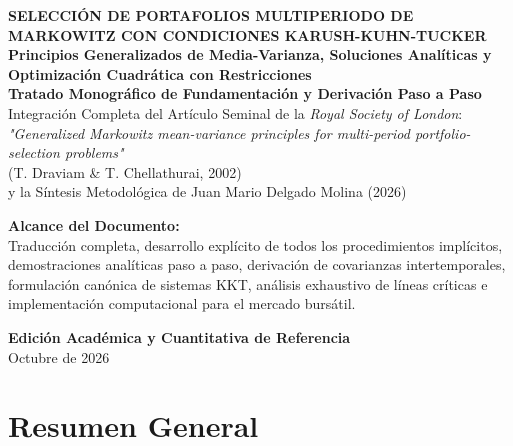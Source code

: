 \documentclass[11pt,a4paper]{report}
\numberwithin{equation}{chapter}
\begin{document}
\begin{titlepage}
    \centering
    \vspace*{1.5cm}
    
    {\Huge \bfseries \color{navyblue} SELECCIÓN DE PORTAFOLIOS MULTIPERIODO DE MARKOWITZ CON CONDICIONES KARUSH-KUHN-TUCKER}\\[0.6cm]
    {\LARGE \textbf{Principios Generalizados de Media-Varianza, Soluciones Analíticas y Optimización Cuadrática con Restricciones}}\\[1.5cm]
    
    \textbf{\Large Tratado Monográfico de Fundamentación y Derivación Paso a Paso}\\[0.4cm]
    \large Integración Completa del Artículo Seminal de la \emph{Royal Society of London}:\\
    \textsl{"Generalized Markowitz mean-variance principles for multi-period portfolio-selection problems"}\\
    (T. Draviam \& T. Chellathurai, 2002)\\
    y la Síntesis Metodológica de Juan Mario Delgado Molina (2026)\\[2.5cm]
    
    \begin{tcolorbox}[colback=navyblue!5!white,colframe=navyblue,arc=3mm,width=0.9\textwidth]
    \centering
    \small \textbf{Alcance del Documento:}\\
    Traducción completa, desarrollo explícito de todos los procedimientos implícitos, demostraciones analíticas paso a paso, derivación de covarianzas intertemporales, formulación canónica de sistemas KKT, análisis exhaustivo de líneas críticas e implementación computacional para el mercado bursátil.
    \end{tcolorbox}
    
    \vfill
    {\large \textbf{Edición Académica y Cuantitativa de Referencia}}\\[0.2cm]
    {\large Octubre de 2026}
\end{titlepage}

\chapter*{Resumen General}
\end{document}
